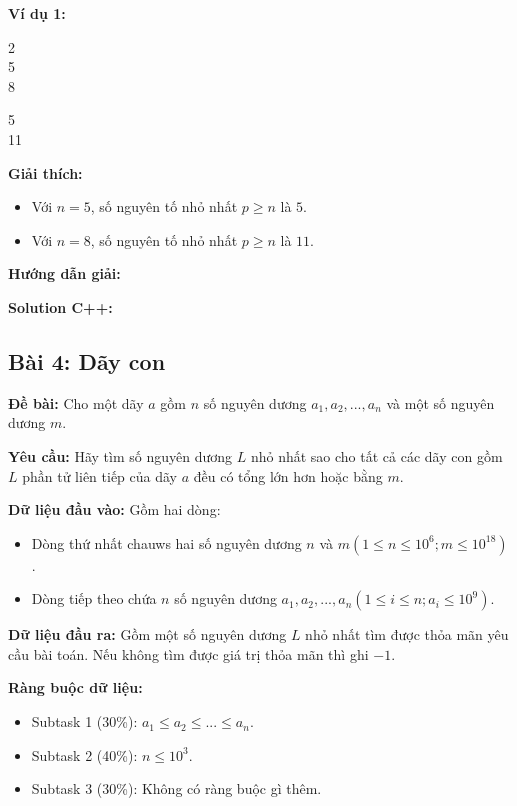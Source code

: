 \documentclass[12pt]{scrartcl}  %
\begin{document}
\textbf{Ví dụ 1:}
\begin{tcolorbox}[colback=gray!5!white, colframe=blue!50!black, title=Input]
2\\
5\\
8
\end{tcolorbox}
\begin{tcolorbox}[colback=gray!5!white, colframe=green!50!black, title=Output]
5\\
11
\end{tcolorbox}

\textbf{Giải thích:}
\begin{itemize}
    \item Với $n = 5$, số nguyên tố nhỏ nhất $p \geq n$ là $5$.
    \item Với $n = 8$, số nguyên tố nhỏ nhất $p \geq n$ là $11$.
\end{itemize}

\textbf{Hướng dẫn giải:}

\textbf{Solution C++:}

\subsection{Bài 4: Dãy con}
\textbf{Đề bài:}
Cho một dãy $a$ gồm $n$ số nguyên dương $a_1, a_2, ..., a_n$ và một số nguyên dương $m$.

\textbf{Yêu cầu:}
Hãy tìm số nguyên dương $L$ nhỏ nhất sao cho tất cả các dãy con gồm $L$ phần tử liên tiếp của dãy $a$ đều có tổng lớn hơn hoặc bằng $m$.

\textbf{Dữ liệu đầu vào:}
Gồm hai dòng:
\begin{itemize}
    \item Dòng thứ nhất chauws hai số nguyên dương $n$ và $m (1 \leq n \leq 10^6; m \leq 10^{18})$.
    \item Dòng tiếp theo chứa $n$ số nguyên dương $a_1, a_2, ..., a_n (1 \leq i \leq n; a_i \leq 10^9)$.
\end{itemize}

\textbf{Dữ liệu đầu ra:}
Gồm một số nguyên dương $L$ nhỏ nhất tìm được thỏa mãn yêu cầu bài toán. Nếu không tìm được giá trị thỏa mãn thì ghi $-1$.

\textbf{Ràng buộc dữ liệu:}
\begin{itemize}
    \item Subtask 1 (30\%): $a_1 \leq a_2 \leq ... \leq a_n$.
    \item Subtask 2 (40\%): $n \leq 10^3$.
    \item Subtask 3 (30\%): Không có ràng buộc gì thêm.
\end{itemize}
\end{document}
